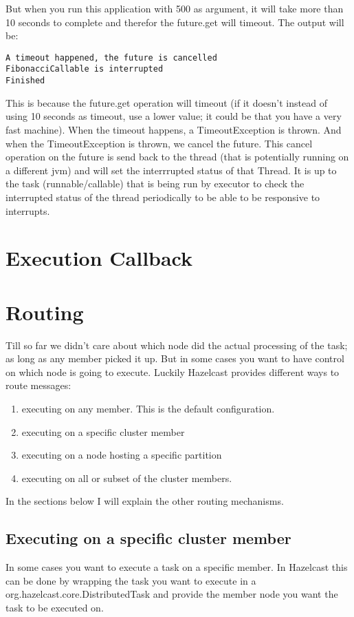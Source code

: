 But when you run this application with 500 as argument, it will take more than 10 seconds to complete and therefor the future.get will timeout. The output will be:
\begin{verbatim}
A timeout happened, the future is cancelled
FibonacciCallable is interrupted
Finished
\end{verbatim}
This is because the future.get operation will timeout (if it doesn't instead of using 10 seconds as timeout, use a lower value; it could be that you have a very fast machine). When the timeout happens, a TimeoutException is thrown. And when the TimeoutException is thrown, we cancel the future. This cancel operation on the future is send back to the thread (that is potentially running on a different jvm) and will set the interrrupted status of that Thread. It is up to the task (runnable/callable) that is being run by executor to check the interrupted status of the thread periodically to be able to be responsive to interrupts.

\section{Execution Callback}

\section{Routing}

Till so far we didn't care about which node did the actual processing of the task; as long as any member picked it up. But in some cases you want to have control on which node is going to execute. Luckily Hazelcast provides different ways to route messages:
\begin{enumerate}
\item executing on any member. This is the default configuration.
\item executing on a specific cluster member
\item executing on a node hosting a specific partition
\item executing on all or subset of the cluster members.
\end{enumerate}
In the sections below I will explain the other routing mechanisms.

\subsection{Executing on a specific cluster member}
In some cases you want to execute a task on a specific member. In Hazelcast this can be done by wrapping the task you want to execute in a org.hazelcast.core.DistributedTask and provide the member node you want the task to be executed on.

